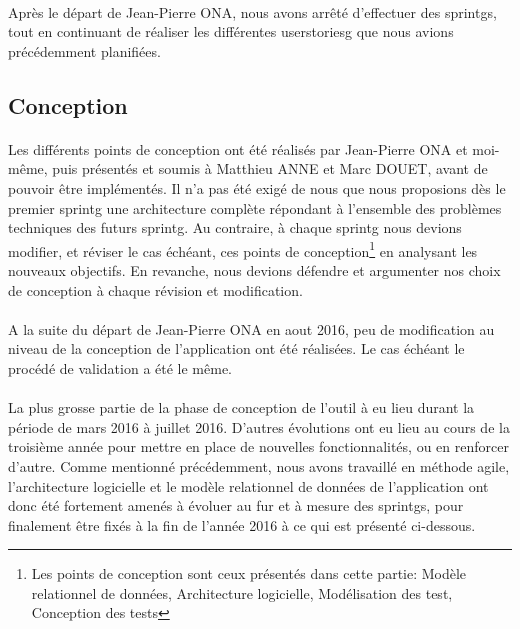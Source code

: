 \documentclass[12pt,a4paper]{report}
\begin{document}
\paragraph*{}Après le départ de Jean-Pierre ONA, nous avons arrêté d'effectuer des \gls{sprintg}s, tout en continuant de réaliser les différentes \gls{userstoriesg} que nous avions précédemment planifiées. \\

\subsection{Conception} 
\paragraph*{}Les différents points de conception ont été réalisés par Jean-Pierre ONA et moi-même, puis présentés et soumis à Matthieu ANNE et Marc DOUET, avant de pouvoir être implémentés. Il n'a pas été exigé de nous que nous proposions dès le premier \gls{sprintg} une architecture complète répondant à l'ensemble des problèmes techniques des futurs \gls{sprintg}. Au contraire, à chaque \gls{sprintg} nous devions  modifier, et réviser le cas échéant, ces points de conception\footnote{Les points de conception sont ceux présentés dans cette partie: Modèle relationnel de données, Architecture logicielle, Modélisation des test, Conception des tests} en analysant les nouveaux objectifs. En revanche, nous devions défendre et argumenter nos choix de conception à chaque révision et modification.
\paragraph*{}A la suite du départ de Jean-Pierre ONA en aout 2016, peu de modification au niveau de la conception de l'application ont été réalisées. Le cas échéant le procédé de validation a été le même.
\paragraph*{}La plus grosse partie de la phase de conception de l'outil à eu lieu durant la période de mars 2016 à juillet 2016. D'autres évolutions ont eu lieu au cours de la troisième année pour mettre en place de nouvelles fonctionnalités, ou en renforcer d'autre. Comme mentionné précédemment, nous avons travaillé en méthode agile, l'architecture logicielle et le modèle relationnel de données de l'application ont donc été fortement amenés à évoluer au fur et à mesure des \gls{sprintg}s, pour finalement être fixés à la fin de l'année 2016 à ce qui est présenté ci-dessous. \\
\end{document}
